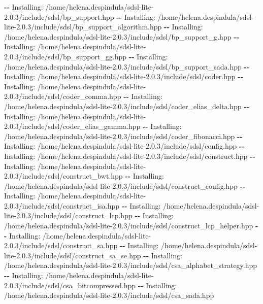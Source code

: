 \documentclass[
]{article}
\newenvironment{Shaded}{\begin{snugshade}}{\end{snugshade}}
\newcommand{\ExtensionTok}[1]{\textcolor[rgb]{0.00,0.60,1.00}{\textbf{#1}}}
\newcommand{\NormalTok}[1]{\textcolor[rgb]{0.81,0.81,0.76}{#1}}
\begin{document}
\begin{Shaded}
\begin{Highlighting}[]
\ExtensionTok{{-}{-}}\NormalTok{ Installing: /home/helena.despindula/sdsl{-}lite{-}2.0.3/include/sdsl/bp\_support.hpp}
\ExtensionTok{{-}{-}}\NormalTok{ Installing: /home/helena.despindula/sdsl{-}lite{-}2.0.3/include/sdsl/bp\_support\_algorithm.hpp}
\ExtensionTok{{-}{-}}\NormalTok{ Installing: /home/helena.despindula/sdsl{-}lite{-}2.0.3/include/sdsl/bp\_support\_g.hpp}
\ExtensionTok{{-}{-}}\NormalTok{ Installing: /home/helena.despindula/sdsl{-}lite{-}2.0.3/include/sdsl/bp\_support\_gg.hpp}
\ExtensionTok{{-}{-}}\NormalTok{ Installing: /home/helena.despindula/sdsl{-}lite{-}2.0.3/include/sdsl/bp\_support\_sada.hpp}
\ExtensionTok{{-}{-}}\NormalTok{ Installing: /home/helena.despindula/sdsl{-}lite{-}2.0.3/include/sdsl/coder.hpp}
\ExtensionTok{{-}{-}}\NormalTok{ Installing: /home/helena.despindula/sdsl{-}lite{-}2.0.3/include/sdsl/coder\_comma.hpp}
\ExtensionTok{{-}{-}}\NormalTok{ Installing: /home/helena.despindula/sdsl{-}lite{-}2.0.3/include/sdsl/coder\_elias\_delta.hpp}
\ExtensionTok{{-}{-}}\NormalTok{ Installing: /home/helena.despindula/sdsl{-}lite{-}2.0.3/include/sdsl/coder\_elias\_gamma.hpp}
\ExtensionTok{{-}{-}}\NormalTok{ Installing: /home/helena.despindula/sdsl{-}lite{-}2.0.3/include/sdsl/coder\_fibonacci.hpp}
\ExtensionTok{{-}{-}}\NormalTok{ Installing: /home/helena.despindula/sdsl{-}lite{-}2.0.3/include/sdsl/config.hpp}
\ExtensionTok{{-}{-}}\NormalTok{ Installing: /home/helena.despindula/sdsl{-}lite{-}2.0.3/include/sdsl/construct.hpp}
\ExtensionTok{{-}{-}}\NormalTok{ Installing: /home/helena.despindula/sdsl{-}lite{-}2.0.3/include/sdsl/construct\_bwt.hpp}
\ExtensionTok{{-}{-}}\NormalTok{ Installing: /home/helena.despindula/sdsl{-}lite{-}2.0.3/include/sdsl/construct\_config.hpp}
\ExtensionTok{{-}{-}}\NormalTok{ Installing: /home/helena.despindula/sdsl{-}lite{-}2.0.3/include/sdsl/construct\_isa.hpp}
\ExtensionTok{{-}{-}}\NormalTok{ Installing: /home/helena.despindula/sdsl{-}lite{-}2.0.3/include/sdsl/construct\_lcp.hpp}
\ExtensionTok{{-}{-}}\NormalTok{ Installing: /home/helena.despindula/sdsl{-}lite{-}2.0.3/include/sdsl/construct\_lcp\_helper.hpp}
\ExtensionTok{{-}{-}}\NormalTok{ Installing: /home/helena.despindula/sdsl{-}lite{-}2.0.3/include/sdsl/construct\_sa.hpp}
\ExtensionTok{{-}{-}}\NormalTok{ Installing: /home/helena.despindula/sdsl{-}lite{-}2.0.3/include/sdsl/construct\_sa\_se.hpp}
\ExtensionTok{{-}{-}}\NormalTok{ Installing: /home/helena.despindula/sdsl{-}lite{-}2.0.3/include/sdsl/csa\_alphabet\_strategy.hpp}
\ExtensionTok{{-}{-}}\NormalTok{ Installing: /home/helena.despindula/sdsl{-}lite{-}2.0.3/include/sdsl/csa\_bitcompressed.hpp}
\ExtensionTok{{-}{-}}\NormalTok{ Installing: /home/helena.despindula/sdsl{-}lite{-}2.0.3/include/sdsl/csa\_sada.hpp}

\end{Highlighting}
\end{Shaded}
\end{document}
